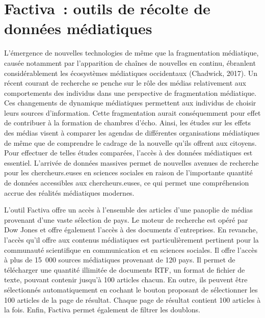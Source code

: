 \documentclass[
  letterpaper,
]{scrbook}
\begin{document}
\hypertarget{factiva-outils-de-ruxe9colte-de-donnuxe9es-muxe9diatiques}{%
\section{\texorpdfstring{\textbf{Factiva~: outils de récolte de données
médiatiques}}{Factiva~: outils de récolte de données médiatiques}}\label{factiva-outils-de-ruxe9colte-de-donnuxe9es-muxe9diatiques}}

L'émergence de nouvelles technologies de même que la fragmentation
médiatique, causée notamment par l'apparition de chaînes de nouvelles en
continu, ébranlent considérablement les écosystèmes médiatiques
occidentaux (Chadwick, 2017). Un récent courant de recherche se penche
sur le rôle des médias relativement aux comportements des individus dans
une perspective de fragmentation médiatique. Ces changements de
dynamique médiatiques permettent aux individus de choisir leurs sources
d'information. Cette fragmentation aurait conséquemment pour effet de
contribuer à la formation de chambres d'écho. Ainsi, les études sur les
effets des médias visent à comparer les agendas de différentes
organisations médiatiques de même que de comprendre le cadrage de la
nouvelle qu'ils offrent aux citoyens. Pour effectuer de telles études
comparées, l'accès à des données médiatiques est essentiel. L'arrivée de
données massives permet de nouvelles avenues de recherche pour les
chercheurs.euses en sciences sociales en raison de l'importante quantité
de données accessibles aux chercheurs.euses, ce qui permet une
compréhension accrue des réalités médiatiques modernes.

L'outil Factiva offre un accès à l'ensemble des articles d'une panoplie
de médias provenant d'une vaste sélection de pays. Le moteur de
recherche est opéré par Dow Jones et offre également l'accès à des
documents d'entreprises. En revanche, l'accès qu'il offre aux contenus
médiatiques est particulièrement pertinent pour la communauté
scientifique en communication et en sciences sociales. Il offre l'accès
à plus de 15~000 sources médiatiques provenant de 120 pays. Il permet de
télécharger une quantité illimitée de documents RTF, un format de
fichier de texte, pouvant contenir jusqu'à 100 articles chacun. En
outre, ils peuvent être sélectionnés automatiquement en cochant le
bouton proposant de sélectionner les 100 articles de la page de
résultat. Chaque page de résultat contient 100 articles à la fois.
Enfin, Factiva permet également de filtrer les doublons.
\end{document}
